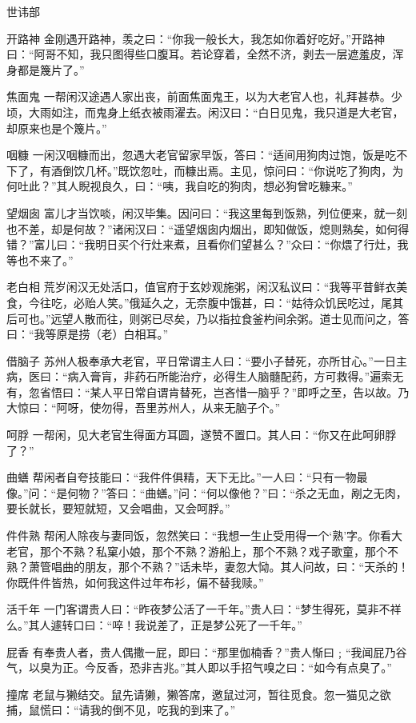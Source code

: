 \documentclass[12pt,UTF8]{ctexbook}
\begin{document}
世讳部

开路神
金刚遇开路神，羡之曰：“你我一般长大，我怎如你着好吃好。”开路神曰：“阿哥不知，我只图得些口腹耳。若论穿着，全然不济，剥去一层遮羞皮，浑身都是篾片了。”

焦面鬼
一帮闲汉途遇人家出丧，前面焦面鬼王，以为大老官人也，礼拜甚恭。少顷，大雨如注，而鬼身上纸衣被雨濯去。闲汉曰：“白日见鬼，我只道是大老官，却原来也是个篾片。”

咽糠
一闲汉咽糠而出，忽遇大老官留家早饭，答曰：“适间用狗肉过饱，饭是吃不下了，有酒倒饮几杯。”既饮忽吐，而糠出焉。主见，惊问曰：“你说吃了狗肉，为何吐此？”其人睨视良久，曰：“咦，我自吃的狗肉，想必狗曾吃糠来。”

望烟囱
富儿才当饮啖，闲汉毕集。因问曰：“我这里每到饭熟，列位便来，就一刻也不差，却是何故？”诸闲汉曰：“遥望烟囱内烟出，即知做饭，熄则熟矣，如何得错？”富儿曰：“我明日买个行灶来煮，且看你们望甚么？”众曰：“你煨了行灶，我等也不来了。”

老白相
荒岁闲汉无处活口，值官府于玄妙观施粥，闲汉私议曰：“我等平昔鲜衣美食，今往吃，必贻人笑。”俄延久之，无奈腹中饿甚，曰：“姑待众饥民吃过，尾其后可也。”远望人散而往，则粥已尽矣，乃以指拉食釜杓间余粥。道士见而问之，答曰：“我等原是捞（老）白相耳。”

借脑子
苏州人极奉承大老官，平日常谓主人曰：“要小子替死，亦所甘心。”一日主病，医曰：“病入膏肓，非药石所能治疗，必得生人脑髓配药，方可救得。”遍索无有，忽省悟曰：“某人平日常自谓肯替死，岂吝惜一脑乎？”即呼之至，告以故。乃大惊曰：“阿呀，使勿得，吾里苏州人，从来无脑子个。”

呵脬
一帮闲，见大老官生得面方耳圆，遂赞不置口。其人曰：“你又在此呵卵脬了？”

曲蟮
帮闲者自夸技能曰：“我件件俱精，天下无比。”一人曰：“只有一物最像。”问：“是何物？”答曰：“曲蟮。”问：“何以像他？”曰：“杀之无血，剐之无肉，要长就长，要短就短，又会唱曲，又会呵脬。”

件件熟
帮闲人除夜与妻同饭，忽然笑曰：“我想一生止受用得一个‘熟’字。你看大老官，那个不熟？私窠小娘，那个不熟？游船上，那个不熟？戏子歌童，那个不熟？萧管唱曲的朋友，那个不熟？”话未毕，妻忽大恸。其人问故，曰：“天杀的！你既件件皆热，如何我这件过年布衫，偏不替我赎。”

活千年
一门客谓贵人曰：“昨夜梦公活了一千年。”贵人曰：“梦生得死，莫非不祥么。”其人遽转口曰：“啐！我说差了，正是梦公死了一千年。”

屁香
有奉贵人者，贵人偶撒一屁，即曰：“那里伽楠香？”贵人惭曰﹔“我闻屁乃谷气，以臭为正。今反香，恐非吉兆。”其人即以手招气嗅之曰：“如今有点臭了。”

撞席
老鼠与獭结交。鼠先请獭，獭答席，邀鼠过河，暂往觅食。忽一猫见之欲捕，鼠慌曰：“请我的倒不见，吃我的到来了。”
\end{document}
